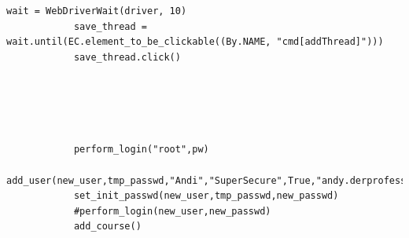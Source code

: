 \documentclass[10pt, a4paper,onecolumn ,titlepage]{article}
\begin{document}
\begin{lstlisting}[label={lst:SeleniumSkript}]
            wait = WebDriverWait(driver, 10)
            save_thread = wait.until(EC.element_to_be_clickable((By.NAME, "cmd[addThread]")))
            save_thread.click()





            perform_login("root",pw)
            add_user(new_user,tmp_passwd,"Andi","SuperSecure",True,"andy.derprofessor@email.com",True)
            set_init_passwd(new_user,tmp_passwd,new_passwd)
            #perform_login(new_user,new_passwd)
            add_course()



    \end{lstlisting}
\end{document}
